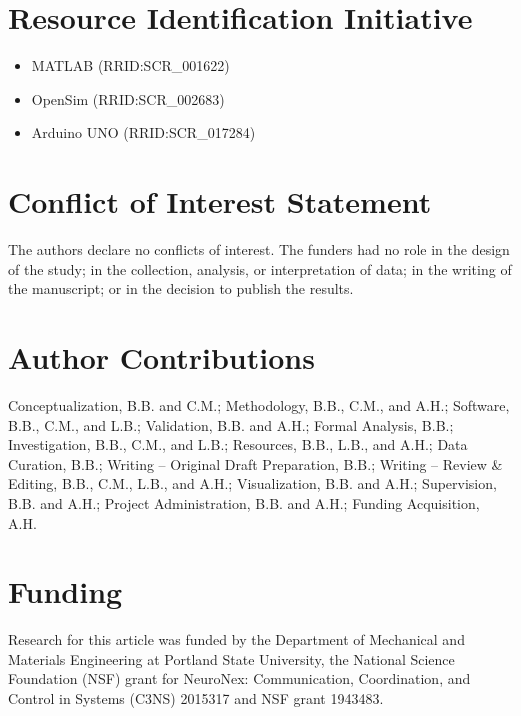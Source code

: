 \documentclass[utf8]{FrontiersinHarvard} %
\begin{document}
\section*{Resource Identification Initiative}
\begin{itemize}
    \item MATLAB (RRID:SCR\_001622)
    \item OpenSim (RRID:SCR\_002683)
    \item Arduino UNO (RRID:SCR\_017284)
\end{itemize}



\section*{Conflict of Interest Statement}
The authors declare no conflicts of interest. The funders had no role in the design of the study; in the collection, analysis, or interpretation of data; in the writing of the manuscript; or in the decision to publish the results.

\section*{Author Contributions}
Conceptualization, B.B. and C.M.; Methodology, B.B., C.M., and A.H.; Software, B.B., C.M., and L.B.; Validation, B.B. and A.H.; Formal Analysis, B.B.; Investigation, B.B., C.M., and L.B.; Resources, B.B., L.B., and A.H.; Data Curation, B.B.; Writing – Original Draft Preparation, B.B.; Writing – Review \& Editing, B.B., C.M., L.B., and A.H.; Visualization, B.B. and A.H.; Supervision, B.B. and A.H.; Project Administration, B.B. and A.H.; Funding Acquisition, A.H.

\section*{Funding}
Research for this article was funded by the Department of Mechanical and Materials Engineering at Portland State University, the National Science Foundation (NSF) grant for NeuroNex: Communication, Coordination, and Control in Systems (C3NS) 2015317 and NSF grant 1943483. 
\end{document}
